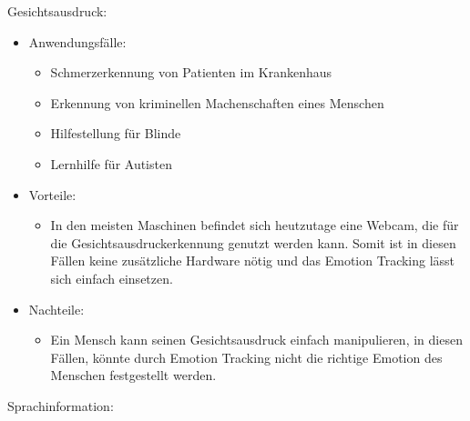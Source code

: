 \noindent Gesichtsausdruck:
\begin{itemize}
	\item Anwendungsfälle:
	\begin{itemize}
		\item Schmerzerkennung von Patienten im Krankenhaus
		\item Erkennung von kriminellen Machenschaften eines Menschen
		\item Hilfestellung für Blinde
		\item Lernhilfe für Autisten
	\end{itemize}
	\item Vorteile:
	\begin{itemize}
		\item In den meisten Maschinen befindet sich heutzutage eine Webcam, die für die Gesichtsausdruckerkennung genutzt werden kann. Somit ist in diesen Fällen keine zusätzliche Hardware nötig und das Emotion Tracking lässt sich einfach einsetzen.		 
	\end{itemize}
	\item Nachteile:
	\begin{itemize}
		\item Ein Mensch kann seinen Gesichtsausdruck einfach manipulieren, in diesen Fällen, könnte durch Emotion Tracking nicht die richtige Emotion des Menschen festgestellt werden.
	\end{itemize}
\end{itemize}
\vspace{2mm}
Sprachinformation: 
